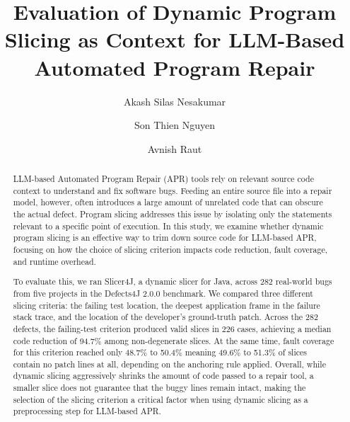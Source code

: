 \documentclass[sigconf,nonacm]{acmart}
\begin{document}
\title{Evaluation of Dynamic Program Slicing as Context for LLM-Based Automated Program Repair}

\author{Akash Silas Nesakumar}

\author{Son Thien Nguyen}

\author{Avnish Raut}

\renewcommand{\shortauthors}{Nesakumar, Nguyen, and Raut}

\begin{abstract}
LLM-based Automated Program Repair (APR) tools rely on relevant source code context to understand and fix software bugs. Feeding an entire source file into a repair model, however, often introduces a large amount of unrelated code that can obscure the actual defect. Program slicing addresses this issue by isolating only the statements relevant to a specific point of execution. In this study, we examine whether dynamic program slicing is an effective way to trim down source code for LLM-based APR, focusing on how the choice of slicing criterion impacts code reduction, fault coverage, and runtime overhead.

To evaluate this, we ran Slicer4J, a dynamic slicer for Java, across 282 real-world bugs from five projects in the Defects4J 2.0.0 benchmark. We compared three different slicing criteria: the failing test location, the deepest application frame in the failure stack trace, and the location of the developer's ground-truth patch. Across the 282 defects, the failing-test criterion produced valid slices in 226 cases, achieving a median code reduction of 94.7\% among non-degenerate slices. At the same time, fault coverage for this criterion reached only 48.7\% to 50.4\% meaning 49.6\% to 51.3\% of slices contain no patch lines at all, depending on the anchoring rule applied. Overall, while dynamic slicing aggressively shrinks the amount of code passed to a repair tool, a smaller slice does not guarantee that the buggy lines remain intact, making the selection of the slicing criterion a critical factor when using dynamic slicing as a preprocessing step for LLM-based APR.
\end{abstract}
\end{document}
